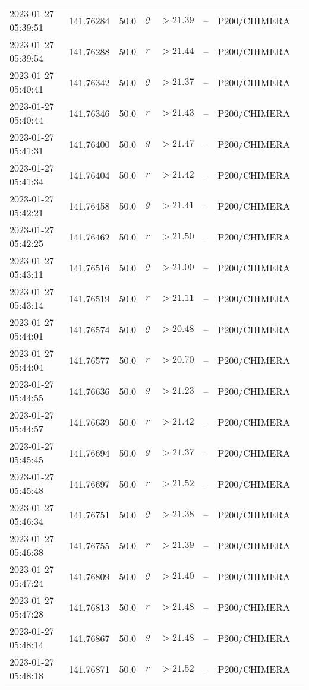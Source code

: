 \documentclass{nature_plusfigure}
\begin{document}
\begin{supplement}
\begin{center}
\begin{longtable}{llllllll}
2023-01-27 05:39:51 & 141.76284 & 50.0 & $g$ & $>21.39$ & -- & P200/CHIMERA &  \\ 
2023-01-27 05:39:54 & 141.76288 & 50.0 & $r$ & $>21.44$ & -- & P200/CHIMERA &  \\ 
2023-01-27 05:40:41 & 141.76342 & 50.0 & $g$ & $>21.37$ & -- & P200/CHIMERA &  \\ 
2023-01-27 05:40:44 & 141.76346 & 50.0 & $r$ & $>21.43$ & -- & P200/CHIMERA &  \\ 
2023-01-27 05:41:31 & 141.76400 & 50.0 & $g$ & $>21.47$ & -- & P200/CHIMERA &  \\ 
2023-01-27 05:41:34 & 141.76404 & 50.0 & $r$ & $>21.42$ & -- & P200/CHIMERA &  \\ 
2023-01-27 05:42:21 & 141.76458 & 50.0 & $g$ & $>21.41$ & -- & P200/CHIMERA &  \\ 
2023-01-27 05:42:25 & 141.76462 & 50.0 & $r$ & $>21.50$ & -- & P200/CHIMERA &  \\ 
2023-01-27 05:43:11 & 141.76516 & 50.0 & $g$ & $>21.00$ & -- & P200/CHIMERA &  \\ 
2023-01-27 05:43:14 & 141.76519 & 50.0 & $r$ & $>21.11$ & -- & P200/CHIMERA &  \\ 
2023-01-27 05:44:01 & 141.76574 & 50.0 & $g$ & $>20.48$ & -- & P200/CHIMERA &  \\ 
2023-01-27 05:44:04 & 141.76577 & 50.0 & $r$ & $>20.70$ & -- & P200/CHIMERA &  \\ 
2023-01-27 05:44:55 & 141.76636 & 50.0 & $g$ & $>21.23$ & -- & P200/CHIMERA &  \\ 
2023-01-27 05:44:57 & 141.76639 & 50.0 & $r$ & $>21.42$ & -- & P200/CHIMERA &  \\ 
2023-01-27 05:45:45 & 141.76694 & 50.0 & $g$ & $>21.37$ & -- & P200/CHIMERA &  \\ 
2023-01-27 05:45:48 & 141.76697 & 50.0 & $r$ & $>21.52$ & -- & P200/CHIMERA &  \\ 
2023-01-27 05:46:34 & 141.76751 & 50.0 & $g$ & $>21.38$ & -- & P200/CHIMERA &  \\ 
2023-01-27 05:46:38 & 141.76755 & 50.0 & $r$ & $>21.39$ & -- & P200/CHIMERA &  \\ 
2023-01-27 05:47:24 & 141.76809 & 50.0 & $g$ & $>21.40$ & -- & P200/CHIMERA &  \\ 
2023-01-27 05:47:28 & 141.76813 & 50.0 & $r$ & $>21.48$ & -- & P200/CHIMERA &  \\ 
2023-01-27 05:48:14 & 141.76867 & 50.0 & $g$ & $>21.48$ & -- & P200/CHIMERA &  \\ 
2023-01-27 05:48:18 & 141.76871 & 50.0 & $r$ & $>21.52$ & -- & P200/CHIMERA &  \\ 

\end{longtable}
\end{center}
\end{supplement}
\end{document}
